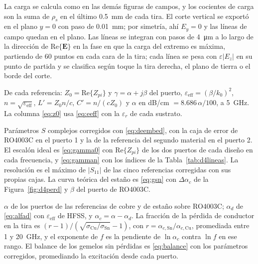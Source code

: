 \documentclass[11pt,letterpaper]{article}
\begin{document}
\begin{description}[style=nextline,leftmargin=0pt,itemsep=4pt,font=\normalfont\bfseries]
\item[Figura~\ref{fig:d3campos} (gap: carga y líneas de campo)] La carga se calcula como en las demás figuras de campos, y los cocientes de carga son la suma de $\rho_s$ en el último \SI{0.5}{mm} de cada tira. El corte vertical se exportó en el plano $y=0$ con paso de \SI{0.01}{mm}; por simetría, ahí $E_y=0$ y las líneas de campo quedan en el plano. Las líneas se integran con pasos de \SI{4}{\micro\metre} a lo largo de la dirección de $\mathrm{Re}\{\mathbf{E}\}$ en la fase en que la carga del extremo es máxima, partiendo de 60 puntos en cada cara de la tira; cada línea se pesa con $\varepsilon|E_z|$ en su punto de partida y se clasifica según toque la tira derecha, el plano de tierra o el borde del corte.

\item[Tabla~\ref{tab:d4lineas} (líneas del cambio de material)] De cada referencia: $Z_0=\mathrm{Re}\{Z_{pi}\}$ y $\gamma=\alpha+j\beta$ del puerto, $\varepsilon_{\mathrm{eff}}=(\beta/k_0)^2$, $n=\sqrt{\varepsilon_{\mathrm{eff}}}$, $L'=Z_0n/c$, $C'=n/(cZ_0)$ y $\alpha$ en dB/cm $=8.686\,\alpha/100$, a \SI{5}{GHz}. La columna \eqref{eq:z0} usa \eqref{eq:eeff} con la $\varepsilon_r$ de cada sustrato.

\item[Figura~\ref{fig:d4refl} y Tabla~\ref{tab:d4sparam} (cambio de material: reflexión)] Parámetros $S$ complejos corregidos con \eqref{eq:deembed}, con la caja de error de RO4003C en el puerto 1 y la de la referencia del segundo material en el puerto 2. El escalón ideal es \eqref{eq:gamma0} con $\mathrm{Re}\{Z_{pi}\}$ de los dos puertos de cada diseño en cada frecuencia, y \eqref{eq:gamman} con los índices de la Tabla~\ref{tab:d4lineas}. La resolución es el máximo de $|S_{11}|$ de las cinco referencias corregidas con sus propias cajas. La curva teórica del estaño es \eqref{eq:gsn} con $\Delta\alpha_c$ de la Figura~\ref{fig:d4perd} y $\beta$ del puerto de RO4003C.

\item[Figura~\ref{fig:d4perd} y Tabla~\ref{tab:d4alfa} (pérdidas)] $\alpha$ de los puertos de las referencias de cobre y de estaño sobre RO4003C; $\alpha_d$ de \eqref{eq:alfad} con $\varepsilon_{\mathrm{eff}}$ de HFSS, y $\alpha_c=\alpha-\alpha_d$. La fracción de la pérdida de conductor en la tira es $(r-1)/(\sqrt{\sigma_{\mathrm{Cu}}/\sigma_{\mathrm{Sn}}}-1)$, con $r=\alpha_{c,\mathrm{Sn}}/\alpha_{c,\mathrm{Cu}}$, promediada entre 1 y \SI{20}{GHz}, y el exponente de $f$ es la pendiente de $\ln\alpha_c$ contra $\ln f$ en ese rango. El balance de los gemelos sin pérdidas es \eqref{eq:balance} con los parámetros corregidos, promediando la excitación desde cada puerto.


\end{description}
\end{document}
